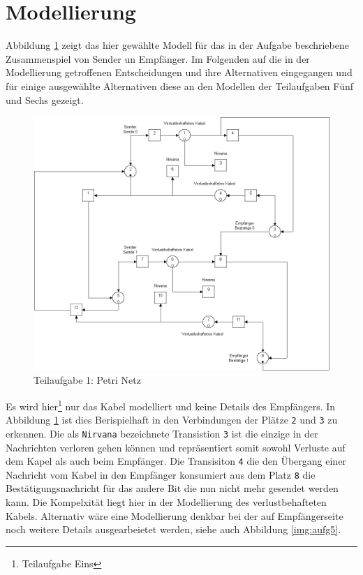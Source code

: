 \documentclass[10pt]{scrartcl}
\author{André Harms, Oliver Steenbuck}
\title{\titletext}
\date{04.04.2012}
\begin{document}
\maketitle

\setcounter{tocdepth}{3}
\tableofcontents

	\listoffigures  
	\lstlistoflistings	

\section{Modellierung}
	Abbildung \ref{img:aufg1} zeigt das hier gewählte Modell für das in der Aufgabe beschriebene Zusammenspiel von Sender un Empfänger. Im Folgenden auf die in der Modellierung getroffenen Entscheidungen und ihre Alternativen eingegangen und für einige ausgewählte Alternativen diese an den Modellen der Teilaufgaben Fünf und Sechs gezeigt.
	  
	\begin{figure}[H]
                \includegraphics[scale=0.5]{praktikum1-aufgabe1.png}
        \caption{Teilaufgabe 1: Petri Netz}
        \label{img:aufg1}
	\end{figure}
	
	
Es wird hier\footnote{Teilaufgabe Eins} nur das Kabel modelliert und keine Details des Empfängers. In Abbildung \ref{img:aufg1} ist dies Berispielhaft in den Verbindungen der Plätze \verb!2! und \verb!3! zu erkennen. Die als \verb!Nirvana! bezeichnete Transistion \verb!3! ist die einzige in der Nachrichten verloren gehen können und repräsentiert somit sowohl Verluste auf dem Kapel als auch beim Empfänger. Die Transisiton \verb!4! die den Übergang einer Nachricht vom Kabel in den Empfänger konsumiert aus dem Platz \verb!8! die Bestätigungsnachricht für das andere Bit die nun nicht mehr gesendet werden kann.
Die Kompelxität liegt hier in der Modellierung des verlustbehafteten Kabels. Alternativ wäre eine Modellierung denkbar bei der auf Empfängerseite noch weitere Details ausgearbeietet werden, siehe auch Abbildung \ref{img:aufg5}.
\end{document}
